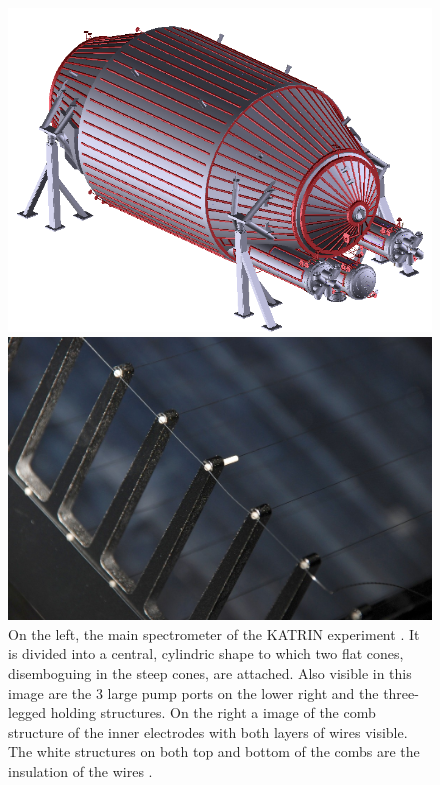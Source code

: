       \begin{figure}
      
      	\begin{minipage}{0.67\textwidth}
      		\includegraphics[width = \textwidth]{graphics/katrinExperiment/mainSpectrometer.jpg}
      	\end{minipage}
      	\begin{minipage}{0.29\textwidth}
      		\includegraphics[angle = 90, width = \textwidth]{graphics/katrinExperiment/wireElectrodes.png}
      	\end{minipage}
      	\caption[Main spectrometer and wire electrodes]{On the left, the main spectrometer of the KATRIN experiment \cite{mainSpecStatus}. It is divided into a central, cylindric shape to which two flat cones, disemboguing in the steep cones, are attached. Also visible in this image are the 3 large pump ports on the lower right and the three-legged holding structures. On the right a image of the comb structure of the inner electrodes with both layers of wires visible. The white structures on both top and bottom of the combs are the insulation of the wires \cite{collabWireElectrodes}.}
      	\label{fig:mainSpec}
      \end{figure}
		
